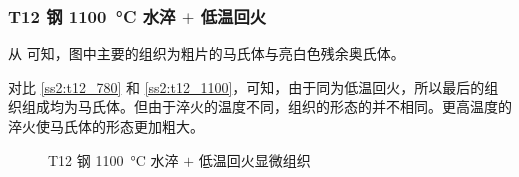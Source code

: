 \documentclass[a4paper,utf8]{article}
\begin{document}
        \subsubsection{T12 钢 \SI{1100}{\degreeCelsius} 水淬 $+$ 低温回火\label{ss2:t12_1100}}
            从 可知，图中主要的组织为粗片的马氏体与亮白色残余奥氏体。\par
            对比 \ref{ss2:t12_780} 和 \ref{ss2:t12_1100}，可知，由于同为低温回火，所以最后的组织组成均为马氏体。但由于淬火的温度不同，组织的形态的并不相同。更高温度的淬火使马氏体的形态更加粗大。
            \begin{figure}[!ht]
                \hspace{20pt}
                \caption{T12 钢 \SI{1100}{\degreeCelsius} 水淬 $+$ 低温回火显微组织\label{fig:n14}}
            \end{figure}
\end{document}
